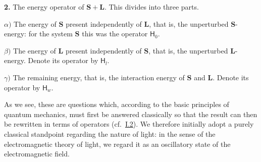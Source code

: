 \documentclass[fontsize=13pt,twoside,openany,headings=normal,parskip=false,bookmarkpackage=false,DIV=calc]{scrbook}
\begin{document}
\leavevmode{}\label{problem:III.6.2}\textbf{2.} The energy operator of $\boldsymbol{S}+\boldsymbol{L}$. This divides into three parts.

\leavevmode{}\label{problem:III.6.2alpha}$\alpha)$ The energy of $\boldsymbol{S}$ present independently of $\boldsymbol{L}$, that is, the unperturbed $\boldsymbol{S}$-energy: for the system $\boldsymbol{S}$ this was the operator $\mathsf{H}_0$.

\leavevmode{}\label{problem:III.6.2beta}$\beta)$ The energy of $\boldsymbol{L}$ present independently of $\boldsymbol{S}$, that is, the unperturbed $\boldsymbol{L}$-energy. Denote its operator by $\mathsf{H}_l$.

\leavevmode{}\label{problem:III.6.2gamma}$\gamma)$ The remaining energy, that is, the interaction energy of $\boldsymbol{S}$ and $\boldsymbol{L}$. Denote its operator by $\mathsf{H}_w$.

As we see, these are questions which, according to the basic principles of quantum mechanics, must first be answered classically so that the result can then be rewritten in terms of operators (cf.\ \hyperref[sec:I.2]{I.2}). We therefore initially adopt a purely classical standpoint regarding the nature of light: in the sense of the electromagnetic theory of light, we regard it as an oscillatory state of the electromagnetic field.
\end{document}
